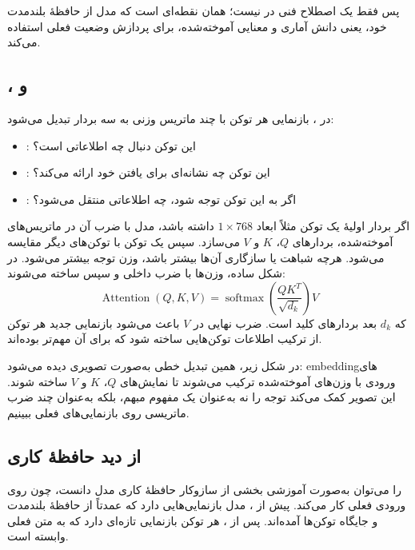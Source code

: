 پس  فقط یک اصطلاح فنی در  نیست؛ همان نقطه‌ای است که مدل از حافظهٔ بلندمدت خود، یعنی دانش آماری و معنایی آموخته‌شده، برای پردازش وضعیت فعلی استفاده می‌کند.

\subsection{،  و }
در ، بازنمایی هر توکن با چند ماتریس وزنی به سه بردار تبدیل می‌شود:
\begin{itemize}
  \item {}: این توکن دنبال چه اطلاعاتی است؟
  \item {}: این توکن چه نشانه‌ای برای یافتن خود ارائه می‌کند؟
  \item {}: اگر به این توکن توجه شود، چه اطلاعاتی منتقل می‌شود؟
\end{itemize}

اگر بردار اولیهٔ یک توکن مثلاً ابعاد \(1 \times 768\) داشته باشد، مدل با ضرب آن در ماتریس‌های آموخته‌شده، بردارهای \(Q\)، \(K\) و \(V\) می‌سازد. سپس  یک توکن با  توکن‌های دیگر مقایسه می‌شود. هرچه شباهت یا سازگاری آن‌ها بیشتر باشد، وزن توجه بیشتر می‌شود. در شکل ساده، وزن‌ها با ضرب داخلی و سپس  ساخته می‌شوند:
\[
\operatorname{Attention}(Q,K,V)=\operatorname{softmax}\left(\frac{QK^{T}}{\sqrt{d_k}}\right)V
\]
که \(d_k\) بعد بردارهای کلید است. ضرب نهایی در \(V\) باعث می‌شود بازنمایی جدید هر توکن از ترکیب اطلاعات توکن‌هایی ساخته شود که برای آن مهم‌تر بوده‌اند.

در شکل زیر، همین تبدیل خطی به‌صورت تصویری دیده می‌شود: embeddingهای ورودی با وزن‌های آموخته‌شده ترکیب می‌شوند تا نمایش‌های \(Q\)، \(K\) و \(V\) ساخته شوند. این تصویر کمک می‌کند توجه را نه به‌عنوان یک مفهوم مبهم، بلکه به‌عنوان چند ضرب ماتریسی روی بازنمایی‌های فعلی ببینیم.


\subsection{ از دید حافظهٔ کاری}
 را می‌توان به‌صورت آموزشی بخشی از سازوکار حافظهٔ کاری مدل دانست، چون روی ورودی فعلی کار می‌کند. پیش از ، مدل بازنمایی‌هایی دارد که عمدتاً از حافظهٔ بلندمدت و جایگاه توکن‌ها آمده‌اند. پس از ، هر توکن بازنمایی تازه‌ای دارد که به متن فعلی وابسته است.

